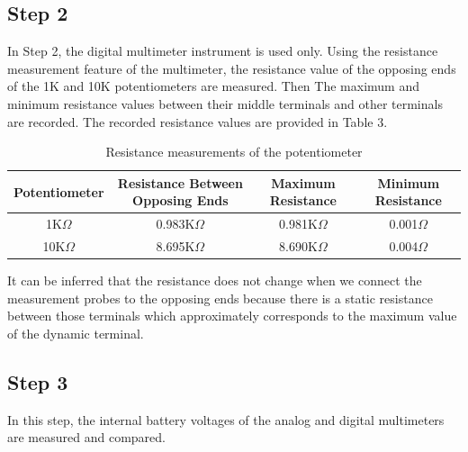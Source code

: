 \documentclass[letterpaper,12pt]{article}
\begin{document}
\subsection{Step 2}
In Step 2, the digital multimeter instrument is used only. Using the resistance measurement feature of the multimeter, the resistance value of the opposing ends of the 1K and 10K potentiometers are measured. Then The maximum and minimum resistance values between their middle terminals and other terminals are recorded.
The recorded resistance values are provided in Table 3.
\begin{table}[H]
	\begin{center}
		\caption{Resistance measurements of the potentiometer}
		\vspace{2mm}
		\begin{tabular}{|| c | c | c | c ||} 
		 \hline
		 Potentiometer & Resistance Between Opposing Ends &  Maximum Resistance & Minimum Resistance\\ [0.5ex] 
		 \hline\hline
		 1K\( \Omega \) & 0.983K\( \Omega \) & 0.981K\( \Omega \) & 0.001\( \Omega \) \\ 
		 \hline
	     10K\( \Omega \) & 8.695K\( \Omega \) & 8.690K\( \Omega \) & 0.004\( \Omega \)  \\
		 \hline
		\end{tabular}
	\end{center}
	\end{table}
It can be inferred that the resistance does not change when we connect the measurement probes to the opposing ends because there is a static resistance between those terminals which approximately corresponds to the maximum value of the dynamic terminal.  
\subsection{Step 3}
In this step, the internal battery voltages of the analog and digital multimeters are measured and compared.
\end{document}

